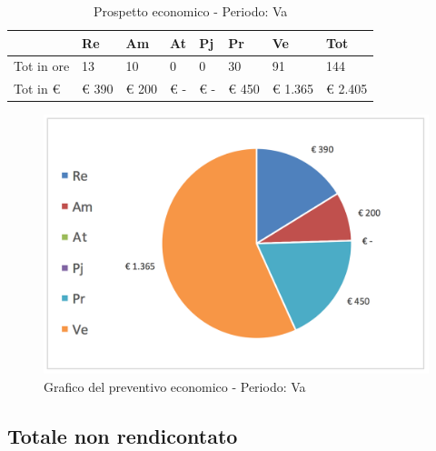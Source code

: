 							\begin{table}[H] \begin{center} \begin{tabular}{llllllll}
							\toprule
								&	\textbf{Re}	&	\textbf{Am}	&	\textbf{At}	&	\textbf{Pj}	&	\textbf{Pr}	&	\textbf{Ve}	&	\textbf{Tot}\\

							\midrule
							Tot in ore	&	13	&	10	&	0	&	0	&	30	&	91	&	144	 \\


							Tot in €	&	 €     390 	 & 	 €      200 	 & 	 €         -   	 & 	 €         -   	 & 	 €    450 	 & 	 €  1.365 	 & 	 €     2.405 	 \\
							\bottomrule
							\end{tabular} \end{center} \caption{Prospetto economico - Periodo:
							Va
							}\label{tab:s_Va} \end{table}		\begin{figure}[H]  \centering  \includegraphics[scale=0.40]{img/s_Va}
									\caption{Grafico del preventivo economico - Periodo: 								Va	}  \label{fig:s_Va	} \end{figure}

	\newpage
	\subsection {Totale non rendicontato}
